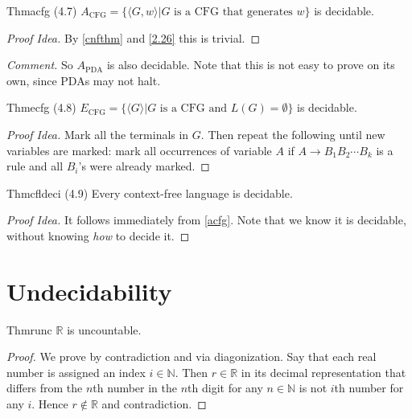 \begin{reference}{Thm}{acfg}
  (4.7) $A_{\mathrm{CFG}}=\{\langle G, w\rangle|G\text{ is a CFG that generates }w\}$ is decidable.
\end{reference}

\begin{proof}[Proof Idea]
  By \ref{cnfthm} and \ref{2.26} this is trivial.
\end{proof}

\textit{Comment.} So $A_{\mathrm{PDA}}$ is also decidable. Note that this is not easy to prove on its own, since PDAs may not halt.

\begin{reference}{Thm}{ecfg}
  (4.8) $E_{\mathrm{CFG}}=\{\langle G\rangle|G\text{ is a CFG and }L(G)=\emptyset\}$ is decidable.
\end{reference}

\begin{proof}[Proof Idea]
  Mark all the terminals in $G$. Then repeat the following until new variables are marked: mark all occurrences of variable $A$ if $A\to B_1B_2\cdots B_k$ is a rule and all $B_i$'s were already marked.
\end{proof}

\begin{reference}{Thm}{cfldeci}
  (4.9) Every context-free language is decidable.
\end{reference}

\begin{proof}[Proof Idea]
  It follows immediately from \ref{acfg}. Note that we know it is decidable, without knowing \textit{how} to decide it.
\end{proof}

\section{Undecidability}

\begin{reference}{Thm}{runc}
  $\mathbb{R}$ is uncountable.
\end{reference}

\begin{proof}
  We prove by contradiction and via diagonization. Say that each real number is assigned an index $i\in \mathbb{N}$. Then $r\in \mathbb{R}$ in its decimal representation that differs from the $n$th number in the $n$th digit for any $n\in \mathbb{N}$ is not $i$th number for any $i$. Hence $r\notin \mathbb{R}$ and contradiction.
\end{proof}

